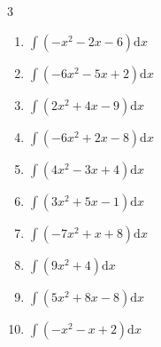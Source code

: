 \begin{multicols}{3}
\begin{enumerate}

\columnbreak %

\resetques

  \item $\displaystyle \int \left( -x^{2}-2x-6 \right) \mathrm{d}x$


  \item $\displaystyle \int \left( -6x^{2}-5x+2 \right) \mathrm{d}x$


  \item $\displaystyle \int \left( 2x^{2}+4x-9 \right) \mathrm{d}x$


  \item $\displaystyle \int \left( -6x^{2}+2x-8 \right) \mathrm{d}x$


  \item $\displaystyle \int \left( 4x^{2}-3x+4 \right) \mathrm{d}x$


  \item $\displaystyle \int \left( 3x^{2}+5x-1 \right) \mathrm{d}x$


  \item $\displaystyle \int \left( -7x^{2}+x+8 \right) \mathrm{d}x$


  \item $\displaystyle \int \left( 9x^{2}+4 \right) \mathrm{d}x$


  \item $\displaystyle \int \left( 5x^{2}+8x-8 \right) \mathrm{d}x$


  \item $\displaystyle \int \left( -x^{2}-x+2 \right) \mathrm{d}x$


\end{enumerate}
\end{multicols}
